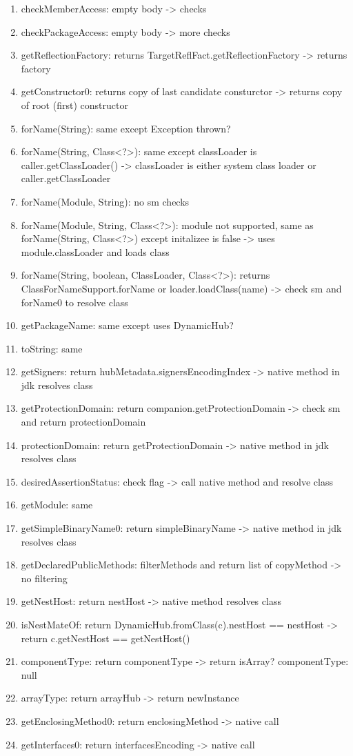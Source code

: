 \begin{enumerate}
    \item checkMemberAccess: empty body -> checks
    \item checkPackageAccess: empty body -> more checks

    \item getReflectionFactory: returns TargetReflFact.getReflectionFactory -> returns factory
    
    \item getConstructor0: returns copy of last candidate consturctor -> returns copy of root (first) constructor
    
    \item forName(String): same except Exception thrown?
    \item forName(String, Class<?>): same except classLoader is caller.getClassLoader() -> classLoader is either system class loader or caller.getClassLoader
    \item forName(Module, String): no sm checks
    \item forName(Module, String, Class<?>): module not supported, same as forName(String, Class<?>) except initalizee is false -> uses module.classLoader and loads class
    \item forName(String, boolean, ClassLoader, Class<?>): returns ClassForNameSupport.forName or loader.loadClass(name) -> check sm and forName0 to resolve class
    
    \item getPackageName: same except uses DynamicHub?
    \item toString: same
    \item getSigners: return hubMetadata.signersEncodingIndex -> native method in jdk resolves class
    \item getProtectionDomain: return companion.getProtectionDomain -> check sm and return protectionDomain
    \item protectionDomain: return getProtectionDomain -> native method in jdk resolves class
    \item desiredAssertionStatus: check flag -> call native method and resolve class
    \item getModule: same
    \item getSimpleBinaryName0: return simpleBinaryName -> native method in jdk resolves class
    \item getDeclaredPublicMethods: filterMethods and return list of copyMethod -> no filtering
    \item getNestHost: return nestHost -> native method resolves class
    \item isNestMateOf: return DynamicHub.fromClass(c).nestHost == nestHost -> return c.getNestHost == getNestHost()
    \item componentType: return componentType -> return isArray? componentType: null
    \item arrayType: return arrayHub -> return newInstance
    \item getEnclosingMethod0: return enclosingMethod -> native call
    \item getInterfaces0: return interfacesEncoding -> native call


\end{enumerate}
